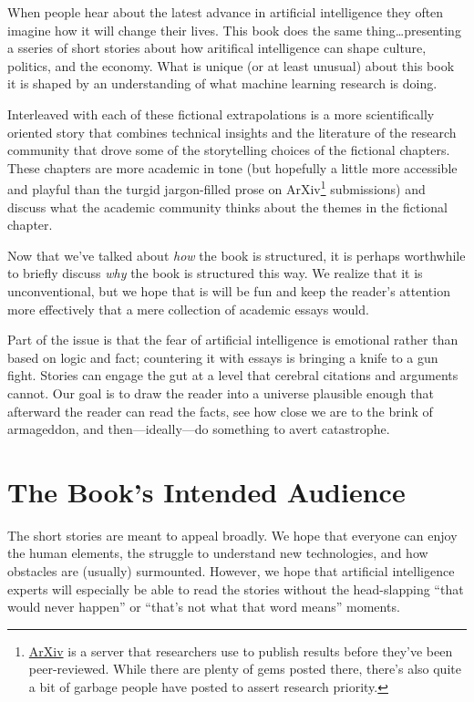 When people hear about the latest advance in artificial intelligence they often imagine how it will change their lives.  This book does the same thing\dots presenting a sseries of short stories about how aritifical intelligence can shape culture, politics, and the economy.  What is unique (or at least unusual) about this book it is shaped by an understanding of what machine learning research is doing.

Interleaved with each of these fictional extrapolations is a more scientifically oriented story that combines technical insights and the literature of the research community that drove some of the storytelling choices of the fictional chapters.  These chapters are more academic in tone (but hopefully a little more accessible and playful than the turgid jargon-filled prose on ArXiv\footnote{\href{http://arxiv.org}{ArXiv} is a server that researchers use to publish results before they've been peer-reviewed.  While there are plenty of gems posted there, there's also quite a bit of garbage people have posted to assert research priority.} submissions) and discuss what the academic community thinks about the themes in the fictional chapter.

Now that we've talked about \emph{how} the book is structured, it is perhaps worthwhile to briefly discuss \emph{why} the book is structured this way.  We realize that it is unconventional, but we hope that is will be fun and keep the reader's attention more effectively that a mere collection of academic essays would.

Part of the issue is that the fear of artificial intelligence is emotional rather than based on logic and fact; countering it with essays is bringing a knife to a gun fight.  Stories can engage the gut at a level that cerebral citations and arguments cannot.  Our goal is to draw the reader into a universe plausible enough that afterward the reader can read the facts, see how close we are to the brink of armageddon, and then---ideally---do something to avert catastrophe.

\section{The Book's Intended Audience}

The short stories are meant to appeal broadly.  We hope that everyone can enjoy the human elements, the struggle to understand new technologies, and how obstacles are (usually) surmounted.  However, we hope that artificial intelligence experts will especially be able to read the stories without the head-slapping ``that would never happen'' or ``that's not what that word means'' moments.

